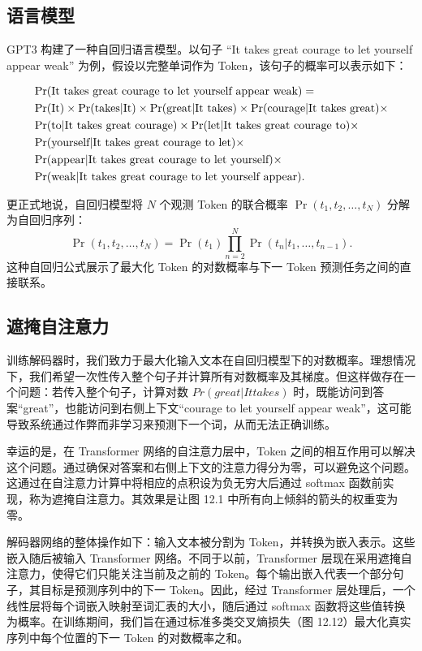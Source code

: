 \documentclass[lang=cn,newtx,10pt,scheme=chinese]{elegantbook}
\begin{document}
\subsection{语言模型}
GPT3 构建了一种自回归语言模型。以句子 “It takes great courage to let yourself appear weak” 为例，假设以完整单词作为 Token，该句子的概率可以表示如下：

\begin{align}
&\Pr(\text{It takes great courage to let yourself appear weak}) = \notag \\
& \Pr(\text{It}) \times \Pr(\text{takes|It}) \times \Pr(\text{great|It takes}) \times \Pr(\text{courage|It takes great}) \times \notag \\
&\Pr(\text{to|It takes great courage}) \times \Pr(\text{let|It takes great courage to}) \times  \notag \\
& \Pr(\text{yourself|It takes great courage to let}) \times \notag \\
& \Pr(\text{appear|It takes great courage to let yourself}) \times \notag \\
& \Pr(\text{weak|It takes great courage to let yourself appear}). 
\end{align} 


更正式地说，自回归模型将 \(N\) 个观测 Token 的联合概率 \(\Pr(t_1, t_2, \ldots, t_N)\) 分解为自回归序列：
\begin{equation}
\Pr(t_1, t_2, \ldots, t_N) = \Pr(t_1) \prod_{n=2}^{N} \Pr(t_n|t_1, \ldots, t_{n-1}). 
\end{equation}
这种自回归公式展示了最大化 Token 的对数概率与下一 Token 预测任务之间的直接联系。

\subsection{遮掩自注意力}
训练解码器时，我们致力于最大化输入文本在自回归模型下的对数概率。理想情况下，我们希望一次性传入整个句子并计算所有对数概率及其梯度。但这样做存在一个问题：若传入整个句子，计算对数 \(Pr(great|It takes)\) 时，既能访问到答案“great”，也能访问到右侧上下文“courage to let yourself appear weak”，这可能导致系统通过作弊而非学习来预测下一个词，从而无法正确训练。

幸运的是，在 Transformer 网络的自注意力层中，Token 之间的相互作用可以解决这个问题。通过确保对答案和右侧上下文的注意力得分为零，可以避免这个问题。这通过在自注意力计算中将相应的点积设为负无穷大后通过 softmax 函数前实现，称为遮掩自注意力。其效果是让图 12.1 中所有向上倾斜的箭头的权重变为零。

解码器网络的整体操作如下：输入文本被分割为 Token，并转换为嵌入表示。这些嵌入随后被输入 Transformer 网络。不同于以前，Transformer 层现在采用遮掩自注意力，使得它们只能关注当前及之前的 Token。每个输出嵌入代表一个部分句子，其目标是预测序列中的下一 Token。因此，经过 Transformer 层处理后，一个线性层将每个词嵌入映射至词汇表的大小，随后通过 softmax 函数将这些值转换为概率。在训练期间，我们旨在通过标准多类交叉熵损失（图 12.12）最大化真实序列中每个位置的下一 Token 的对数概率之和。
\end{document}
